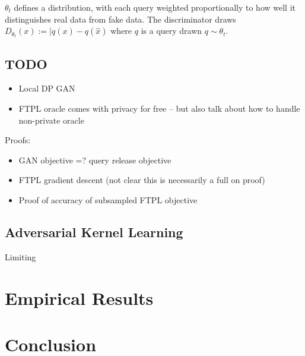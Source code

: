 \documentclass[]{article}
\theoremstyle{definition}
\begin{document}
$\theta_t$ defines a distribution, with each query weighted proportionally to how well it distinguishes real data from fake data. The discriminator draws  $D_{\theta_t}(x) := |q(x) - q(\hat x)$ where $q$ is a query drawn $q \sim \theta_t$. 

\subsection{TODO}
\begin{itemize}
    \item Local DP GAN
    \item FTPL oracle comes with privacy for free -- but also talk about how to handle non-private oracle
\end{itemize}

Proofs:

\begin{itemize}
    \item GAN objective =? query release objective
    \item FTPL gradient descent (not clear this is necessarily a full on proof)
    \item Proof of accuracy of subsampled FTPL objective
\end{itemize}

\subsection{Adversarial Kernel Learning}

Limiting 

\section{Empirical Results}

\section{Conclusion}




\newpage

\appendix
\end{document}
